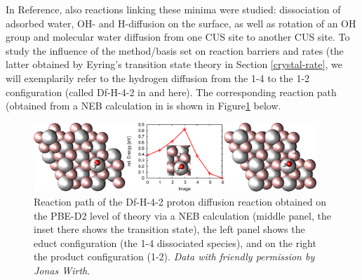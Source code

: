 \documentclass[11pt,DIV=13,BCOR=5mm,a4paper,headinclude]{scrbook}
\begin{document}
In Reference\cite{WirthJPCC2012}, also reactions linking these minima were studied: dissociation of adsorbed water, OH- and H-diffusion on the surface, as well as rotation of an OH group and molecular water diffusion from one CUS site to another CUS site.
To study the influence of the method/basis set on reaction barriers and rates (the latter obtained by Eyring's transition state theory in Section \ref{crystal-rate}, we will exemplarily refer to the hydrogen diffusion from the 1-4 to the 1-2 configuration (called Df-H-4-2 in \cite{WirthJPCC2012} and here).
The corresponding reaction path (obtained from a NEB calculation in \cite{WirthJPCC2012} is shown in Figure\ref{abb:df-h-4-2} below.
\begin{figure}[h]
\centering
\includegraphics[width=0.95\textwidth]{figures/0001/NEB-path/df-h-4-2.pdf}
\caption{Reaction path of the Df-H-4-2 proton diffusion reaction obtained on the PBE-D2 level of theory via a NEB calculation (middle panel, the inset there shows the transition state), the left panel shows the educt configuration (the 1-4 dissociated species), and on the right the product configuration (1-2).
\textit{Data with friendly permission by Jonas Wirth}.}
       \label{abb:df-h-4-2}
\end{figure}
\end{document}
